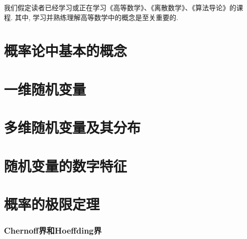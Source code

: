 
\usepackage{ctex}
\usepackage{pifont}
\usepackage{cleveref}
\usepackage{pstricks}
\usepackage{pgfplots}





我们假定读者已经学习或正在学习《高等数学》、《离散数学》、《算法导论》的课程. 其中, 学习并熟练理解高等数学中的概念是至关重要的. 

\part{概率论中基本的概念}


\begin{shaded}
    
\end{shaded}


\begin{shaded}
    
\end{shaded}

\part{一维随机变量}





\part{多维随机变量及其分布}





\part{随机变量的数字特征}








\part{概率的极限定理}



\section{Chernoff界和Hoeffding界}

